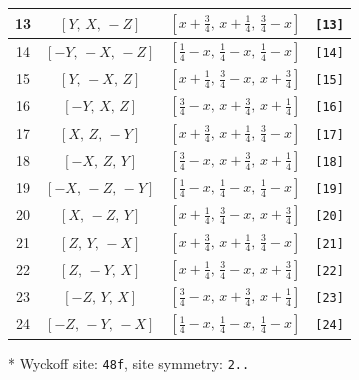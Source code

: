 \documentclass[fleqn,8pt]{jsarticle}
\begin{document}
\begin{longtable}{cccc}
13 & $\left[ Y,\, X,\, - Z \right]$ & $\left[ x + \frac{3}{4},\, x + \frac{1}{4},\, \frac{3}{4} - x \right]$ & {\tt [13]} \\ \hline
14 & $\left[ - Y,\, - X,\, - Z \right]$ & $\left[ \frac{1}{4} - x,\, \frac{1}{4} - x,\, \frac{1}{4} - x \right]$ & {\tt [14]} \\ \hline
15 & $\left[ Y,\, - X,\, Z \right]$ & $\left[ x + \frac{1}{4},\, \frac{3}{4} - x,\, x + \frac{3}{4} \right]$ & {\tt [15]} \\ \hline
16 & $\left[ - Y,\, X,\, Z \right]$ & $\left[ \frac{3}{4} - x,\, x + \frac{3}{4},\, x + \frac{1}{4} \right]$ & {\tt [16]} \\ \hline
17 & $\left[ X,\, Z,\, - Y \right]$ & $\left[ x + \frac{3}{4},\, x + \frac{1}{4},\, \frac{3}{4} - x \right]$ & {\tt [17]} \\ \hline
18 & $\left[ - X,\, Z,\, Y \right]$ & $\left[ \frac{3}{4} - x,\, x + \frac{3}{4},\, x + \frac{1}{4} \right]$ & {\tt [18]} \\ \hline
19 & $\left[ - X,\, - Z,\, - Y \right]$ & $\left[ \frac{1}{4} - x,\, \frac{1}{4} - x,\, \frac{1}{4} - x \right]$ & {\tt [19]} \\ \hline
20 & $\left[ X,\, - Z,\, Y \right]$ & $\left[ x + \frac{1}{4},\, \frac{3}{4} - x,\, x + \frac{3}{4} \right]$ & {\tt [20]} \\ \hline
21 & $\left[ Z,\, Y,\, - X \right]$ & $\left[ x + \frac{3}{4},\, x + \frac{1}{4},\, \frac{3}{4} - x \right]$ & {\tt [21]} \\ \hline
22 & $\left[ Z,\, - Y,\, X \right]$ & $\left[ x + \frac{1}{4},\, \frac{3}{4} - x,\, x + \frac{3}{4} \right]$ & {\tt [22]} \\ \hline
23 & $\left[ - Z,\, Y,\, X \right]$ & $\left[ \frac{3}{4} - x,\, x + \frac{3}{4},\, x + \frac{1}{4} \right]$ & {\tt [23]} \\ \hline
24 & $\left[ - Z,\, - Y,\, - X \right]$ & $\left[ \frac{1}{4} - x,\, \frac{1}{4} - x,\, \frac{1}{4} - x \right]$ & {\tt [24]} \\
\end{longtable}
* Wyckoff site: {\tt 48f}, site symmetry: {\tt 2..}
\renewcommand{\arraystretch}{1.2}
\end{document}
